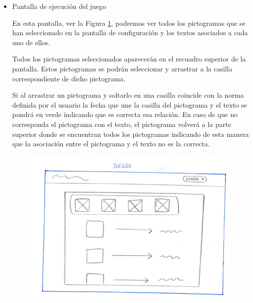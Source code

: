 \begin{itemize}
\begin{itemize}
		
		Las funcionalidades que podemos encontrar en la parte del tablero son las siguientes:
		
		\begin{itemize}
			\item Añadir una nueva casilla: al pulsar sobre este botón se añadirá sobre el tablero sin cuadricular una casilla para insertar un pictograma, imagen, icono o figura geométrica, una flecha y un campo de texto.
			Esto permitirá crear una asociación entre un pictograma y su texto correspondiente para posteriormente ejecutar el juego.
			
			\item Jugar: en la parte superior tendremos un botón que al pulsarlo ejecutará el juego con las normas que estén creadas. Este botón al pulsarlo nos llevará a la pantalla de juego, ver Figura \ref{fig:juegojorge}.
			
		\end{itemize}
		
		\item Pantalla de ejecución del juego
		
		En esta pantalla, ver la Figura \ref{fig:juegojorge},  podremos ver todos los pictogramas que se han seleccionado en la pantalla de configuración y los textos asociados a cada uno de ellos.
		
		Todos los pictogramas seleccionados aparecerán en el recuadro superior de la pantalla. Estos pictogramas se podrán seleccionar y arrastrar a la casilla correspondiente de dicho pictograma.
		
		Si al arrastrar un pictograma y soltarlo en una casilla coincide con la norma definida por el usuario la fecha que une la casilla del pictograma y el texto se pondrá en verde indicando que es correcta esa relación. En caso de que no corresponda el pictograma con el texto, el pictograma volverá a la parte superior donde se encuentran todos los pictogramas indicando de esta manera que la asociación entre el pictograma y el texto no es la correcta.
		
		\begin{figure}[h!]
			\centering
			\includegraphics[width=0.7\linewidth]{Imagenes/Bitmap/juegoJorge}
			\caption{}
			\label{fig:juegojorge}
		\end{figure}
		
	\end{itemize}
	
\end{itemize}

